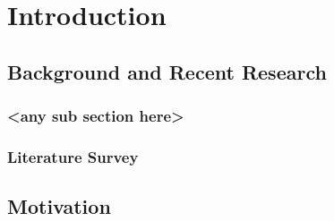 \chapter{Introduction}

\section{Background and Recent Research}
\subsection{<any sub section here>}

\subsection{Literature Survey}

\section{Motivation}
